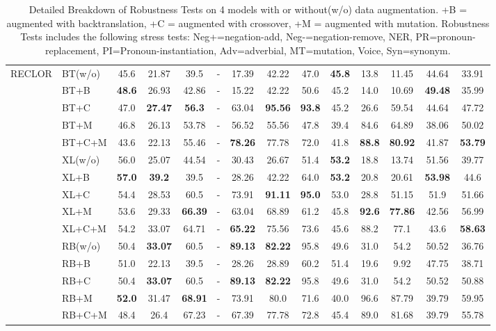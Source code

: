 \documentclass[11pt,a4paper]{article}
\begin{document}
\begin{table*}[th]
\begin{tabular}{ll|c|ccccccccccc}
	\midrule
\multirow{15}{*}{RECLOR} 

 		    
                &  BT(w/o) &45.6&21.87&39.5&-&17.39&42.22&47.0&\bf{45.8}&13.8&11.45&44.64&33.91
                						\\ 
		&  BT+B &\bf{48.6}&26.93&42.86&-&15.22&42.22&50.6&45.2&14.0&10.69&\bf{49.48}&35.99
 						        \\ 
		&  BT+C &47.0&\bf{27.47}&\bf{56.3}&-&63.04&\bf{95.56}&\bf{93.8}&45.2&26.6&59.54&44.64&47.72
 						        \\ 
		   & BT+M & 46.8&26.13&53.78&-&56.52&55.56&47.8&39.4&84.6&64.89&38.06&50.02
 						       \\ 
		   & BT+C+M& 43.6&22.13&55.46&-&\bf{78.26}&77.78&72.0&41.8&\bf{88.8}&\bf{80.92}&41.87&\bf{53.79}
		
 					     	       \\ \cmidrule{2-14}
		&  XL(w/o) &56.0&25.07&44.54&-&30.43&26.67&51.4&\bf{53.2}&18.8&13.74&51.56&39.77
                						\\ 
		&  XL+B & \bf{57.0}&\bf{39.2}&39.5&-&28.26&42.22&64.0&\bf{53.2}&20.8&20.61&\bf{53.98}&44.6
 						        \\ 
		&  XL+C & 54.4&28.53&60.5&-&73.91&\bf{91.11}&\bf{95.0}&53.0&28.8&51.15&51.9&51.66
							
 						        \\ 
		   & XL+M &53.6&29.33&\bf{66.39}&-&63.04&68.89&61.2&45.8&\bf{92.6}&\bf{77.86}&42.56 	&56.99				       \\ 
		   & XL+C+M& 54.2&33.07&64.71&-&\bf{65.22}&75.56&73.6&45.6&88.2&77.1&43.6&\bf{58.63}
 					     	       \\ \cmidrule{2-14}
	&  RB(w/o) & 50.4&\bf{33.07}&60.5&-&\bf{89.13}&\bf{82.22}&95.8&49.6&31.0&54.2&50.52&36.76
                						\\ 
		&  RB+B & 51.0&22.13&39.5&-&28.26&28.89&60.2&51.4&19.6&9.92&47.75&38.71
 						        \\ 
		&  RB+C & 50.4&\bf{33.07}&60.5&-&\bf{89.13}&\bf{82.22}&95.8&49.6&31.0&54.2&50.52&50.88
 						        \\ 
		   & RB+M &\bf{52.0}&31.47&\bf{68.91}&-&73.91&80.0&71.6&40.0&96.6&87.79&39.79&59.95
 						       \\ 
		   & RB+C+M&48.4&26.4&67.23&-&67.39&77.78&72.8&45.4&89.0&81.68&39.79&55.78
 					     	       \\ 


\bottomrule
\hline
\end{tabular}
\caption{\label{tab:results} Detailed Breakdown of Robustness Tests
on 4 models with or without(w/o) data augmentation. 
+B = augmented with backtranslation,
+C = augmented with crossover, +M = augmented with mutation. 
Robustness Tests includes the following stress tests: 
Neg+=negation-add, Neg-=negation-remove, NER, 
PR=pronoun-replacement, PI=Pronoun-instantiation, Adv=adverbial, MT=mutation, Voice, Syn=synonym.}
\end{table*}
\end{document}
